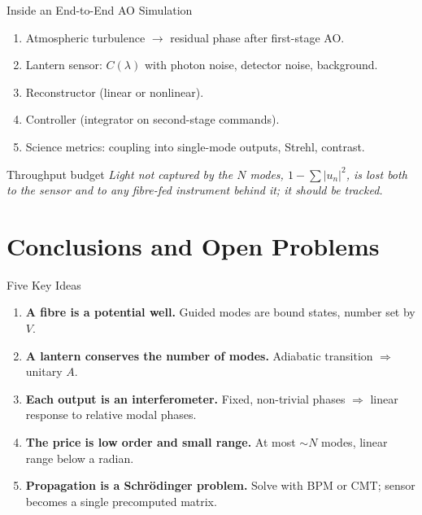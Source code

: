 \documentclass[aspectratio=169,10pt]{beamer}
\begin{document}
\begin{frame}{Inside an End-to-End AO Simulation}
\begin{enumerate}
    \item Atmospheric turbulence \(\to\) residual phase after first-stage AO.
    \item Lantern sensor: \(C(\lambda)\) with photon noise, detector noise, background.
    \item Reconstructor (linear or nonlinear).
    \item Controller (integrator on second-stage commands).
    \item Science metrics: coupling into single-mode outputs, Strehl, contrast.
\end{enumerate}
\begin{block}{Throughput budget}
\emph{Light not captured by the \(N\) modes, \(1 - \sum |u_n|^2\), is lost both to the sensor and to any fibre-fed instrument behind it; it should be tracked.}
\end{block}
\end{frame}

\section{Conclusions and Open Problems}
\begin{frame}{Five Key Ideas}
\begin{enumerate}
    \item \textbf{A fibre is a potential well.} Guided modes are bound states, number set by \(V\).
    \item \textbf{A lantern conserves the number of modes.} Adiabatic transition \(\Rightarrow\) unitary \(A\).
    \item \textbf{Each output is an interferometer.} Fixed, non-trivial phases \(\Rightarrow\) linear response to relative modal phases.
    \item \textbf{The price is low order and small range.} At most \(\sim N\) modes, linear range below a radian.
    \item \textbf{Propagation is a Schrödinger problem.} Solve with BPM or CMT; sensor becomes a single precomputed matrix.
\end{enumerate}
\end{frame}
\end{document}

